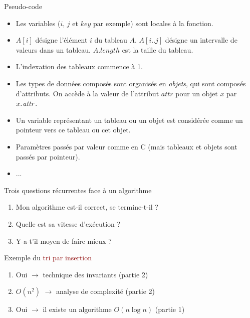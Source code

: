 \begin{frame}{Pseudo-code}

\begin{itemize}
\item Les variables ($i$, $j$ et $key$ par exemple) sont locales à la fonction.
\item $A[i]$ désigne l'élément $i$ du tableau $A$. $A[i..j]$ désigne
  un intervalle de valeurs dans un tableau. $A.length$ est la taille du tableau.
\item L'indexation des tableaux commence à 1.
\item Les types de données composés sont organisés en {\it objets}, qui sont composés d'attributs. On accède à la valeur de l'attribut $attr$ pour un objet $x$ par $\attrib{x}{attr}$.
\item Un variable représentant un tableau ou un objet est considérée comme un pointeur vers ce tableau ou cet objet.
\item Paramètres passés par valeur comme en C (mais tableaux et objets sont passés par pointeur).
\item ...
\end{itemize}
\end{frame}

\begin{frame}{Trois questions récurrentes face à un algorithme}

\begin{enumerate}
\item Mon algorithme est-il correct, se termine-t-il ? %

\bigskip

\item Quelle est sa vitesse d'exécution ? %

\bigskip

\item Y-a-t'il moyen de faire mieux ? %

\end{enumerate}

\bigskip

Exemple du \textcolor{darkred}{tri par insertion}
\begin{enumerate}
\item Oui $\rightarrow$ technique des invariants (partie 2)
\item $O(n^2)$ $\rightarrow$ analyse de complexité (partie 2)
\item Oui $\rightarrow$ il existe un algorithme $O(n\log n)$ (partie 1)
\end{enumerate}

\end{frame}


